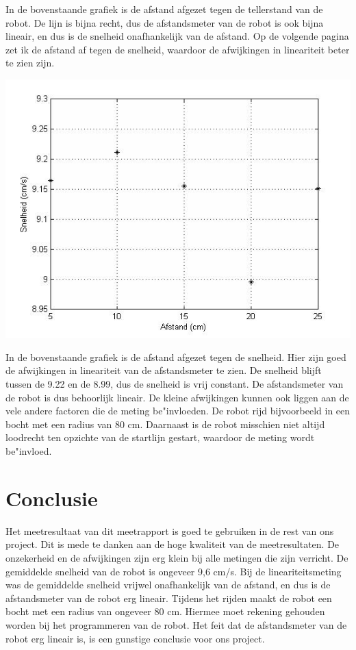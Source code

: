 \documentclass{thema}
\begin{document}
In de bovenstaande grafiek is de afstand afgezet tegen de tellerstand van de robot. De lijn is bijna recht, dus de afstandsmeter van de robot is ook bijna lineair, en dus is de snelheid onafhankelijk van de afstand.  Op de volgende pagina zet ik de afstand af tegen de snelheid, waardoor de afwijkingen in lineariteit beter te zien zijn. 
\begin{center}
\includegraphics[width=150mm] {afstand-snelheid.jpg}
\end{center}
In de bovenstaande grafiek is de afstand afgezet tegen de snelheid. Hier zijn goed de afwijkingen in lineariteit van de afstandsmeter te zien. De snelheid blijft tussen de 9.22 en de 8.99, dus de snelheid is vrij constant. De afstandsmeter van de robot is dus behoorlijk lineair. De kleine afwijkingen kunnen ook liggen aan de vele andere factoren die de meting be"invloeden. De robot rijd bijvoorbeeld in een bocht met een radius van 80 cm. Daarnaast is de robot misschien niet altijd loodrecht ten opzichte van de startlijn gestart, waardoor de meting wordt be"invloed.
\newpage
\chapter{Conclusie}
Het meetresultaat van dit meetrapport is goed te gebruiken in de rest van ons project. Dit is mede te danken aan de hoge kwaliteit van de meetresultaten. De onzekerheid en de afwijkingen zijn erg klein bij alle metingen die zijn verricht. De gemiddelde snelheid van de robot is ongeveer 9,6 cm/s. Bij de lineariteitsmeting was de gemiddelde snelheid vrijwel onafhankelijk van de afstand, en dus is de afstandsmeter van de robot erg lineair. Tijdens het rijden maakt de robot een bocht met een radius van ongeveer 80 cm. Hiermee moet rekening gehouden worden bij het programmeren van de robot. Het feit dat de afstandsmeter van de robot erg lineair is, is een gunstige conclusie voor ons project.
\end{document}
